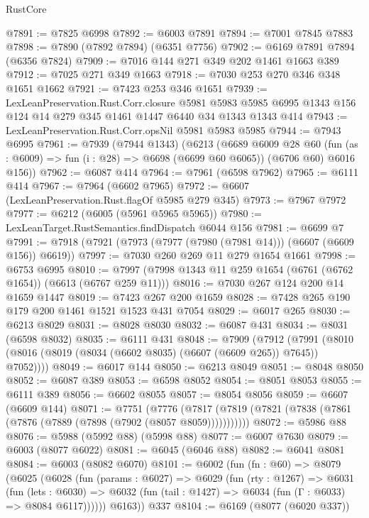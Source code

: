 \begin{lexlean}{RustCore}
\begin{coremodule}
{\begin{coremodule}
{{{{{{{{{{{{{{{{{{{{{{{{{{{{{{{{{{{{{{{{{{{{{{{@7891 := @7825 @6998
@7892 := @6003 @7891
@7894 := @7001 @7845 @7883
@7898 := @7890 (@7892 @7894) (@6351 @7756)
@7902 := @6169 @7891 @7894 (@6356 @7824)
@7909 := @7016 @144 @271 @349 @202 @1461 @1663 @389
@7912 := @7025 @271 @349 @1663
@7918 := @7030 @253 @270 @346 @348 @1651 @1662
@7921 := @7423 @253 @346 @1651
@7939 := LexLeanPreservation.Rust.Corr.closure
    @5981
    @5983
    @5985
    @6995
    @1343
    @156
    @124
    @14
    @279
    @345
    @1461
    @1447
    @6440
    @34
    @1343
    @1343
    @414
@7943 := LexLeanPreservation.Rust.Corr.opsNil @5981 @5983 @5985
@7944 := @7943 @6995
@7961 := @7939
    (@7944 @1343)
    (@6213
      (@6689
        @6009
        @28
        @60
        (fun (as : @6009) => fun (i : @28) => @6698 (@6699 @60 @6065))
        (@6706 @60)
        @6016
        @156))
@7962 := @6087 @414
@7964 := @7961 (@6598 @7962)
@7965 := @6111 @414
@7967 := @7964 (@6602 @7965)
@7972 := @6607 (LexLeanPreservation.Rust.flagOf @5985 @279 @345)
@7973 := @7967 @7972
@7977 := @6212 (@6005 (@5961 @5965 @5965))
@7980 := LexLeanTarget.RustSemantics.findDispatch @6044 @156
@7981 := @6699 @7
@7991 := @7918 (@7921 (@7973 (@7977 (@7980 (@7981 @14))) (@6607 (@6609 @156)) @6619))
@7997 := @7030 @260 @269 @11 @279 @1654 @1661
@7998 := @6753 @6995
@8010 := @7997 (@7998 @1343 @11 @259 @1654 (@6761 (@6762 @1654)) (@6613 (@6767 @259 @11)))
@8016 := @7030 @267 @124 @200 @14 @1659 @1447
@8019 := @7423 @267 @200 @1659
@8028 := @7428 @265 @190 @179 @200 @1461 @1521 @1523 @431 @7054
@8029 := @6017 @265
@8030 := @6213 @8029
@8031 := @8028 @8030
@8032 := @6087 @431
@8034 := @8031 (@6598 @8032)
@8035 := @6111 @431
@8048 := @7909
    (@7912 (@7991 (@8010 (@8016 (@8019 (@8034 (@6602 @8035) (@6607 (@6609 @265)) @7645)) @7052))))
@8049 := @6017 @144
@8050 := @6213 @8049
@8051 := @8048 @8050
@8052 := @6087 @389
@8053 := @6598 @8052
@8054 := @8051 @8053
@8055 := @6111 @389
@8056 := @6602 @8055
@8057 := @8054 @8056
@8059 := @6607 (@6609 @144)
@8071 := @7751
    (@7776 (@7817 (@7819 (@7821 (@7838 (@7861 (@7876 (@7889 (@7898 (@7902 (@8057 @8059)))))))))))
@8072 := @5986 @88
@8076 := @5988 (@5992 @88) (@5998 @88)
@8077 := @6007 @7630
@8079 := @6003 (@8077 @6022)
@8081 := @6045 (@6046 @88)
@8082 := @6041 @8081
@8084 := @6003 (@8082 @6070)
@8101 := @6002
    (fun (fn : @60) =>
    @8079
      (@6025
        (@6028
          (fun (params : @6027) =>
          @6029
            (fun (rty : @1267) =>
            @6031
              (fun (lets : @6030) =>
              @6032 (fun (tail : @1427) => @6034 (fun (Γ : @6033) => @8084 @6117))))))
        @6163))
    @337
@8104 := @6169 (@8077 (@6020 @337))
}}}}}}}}}}}}}}}}}}}}}}}}}}}}}}}}}}}}}}}}}}}}}}}
\end{coremodule}}
\end{coremodule}
\end{lexlean}
